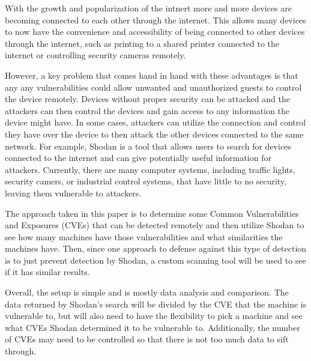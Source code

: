 With the growth and popularization of the intnert more and more devices
are becoming connected to each other through the internet. This allows many
devices to now have the convenience and accessibility of being connected
to other devices through the internet, such as printing to a
shared printer connected to the internet or controlling security cameras
remotely.

However, a key problem that comes hand in hand with these advantages is that
any any vulnerabilities could allow unwanted and unauthorized guests to
control the device remotely. Devices without proper security can be attacked
and the attackers can then control the devices and gain access to any
information the device might have. In some cases, attackers can utilize the
connection and control they have over the device to then attack the other
devices connected to the same network. For example, Shodan is a tool that
allows users to search for devices connected to the internet and can give
potentially useful information for attackers. Currently, there are many
computer systems, including traffic lights, security camers, or industrial
control systems, that have little to no security, leaving them vulnerable to
attackers\cite{afit//CSAR-10-025-01}.

The approach taken in this paper is to determine some Common Vulnerabilities
and Exposures (CVEs) that can be detected remotely and then utilize Shodan
to see how many machines have those vulnerabilities and what similarities
the machines have. Then, since one approach to defense against this type of
detection is to just prevent detection by Shodan, a custom scanning tool
will be used to see if it has similar results.

Overall, the setup is simple and is mostly data analysis and comparison.
The data returned by Shodan's search will be divided by the CVE that the
machine is vulnerable to, but will also need to have the flexibility to
pick a machine and see what CVEs Shodan determined it to be vulnerable to.
Additionally, the number of CVEs may need to be controlled so that there
is not too much data to sift through.

